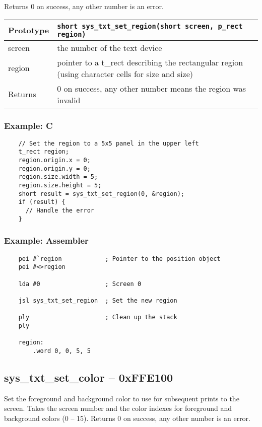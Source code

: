 Returns 0 on success, any other number is an error.

\bigskip

\begin{tabular}{|l||l|} \hline
Prototype & \lstinline!short sys_txt_set_region(short screen, p_rect region)! \\ \hline
screen & the number of the text device \\ \hline
region & pointer to a t\_rect describing the rectangular region (using character cells for size and size) \\ \hline
Returns & 0 on success, any other number means the region was invalid \\ \hline
\end{tabular}

\subsubsection*{Example: C}
\begin{lstlisting}
    // Set the region to a 5x5 panel in the upper left
    t_rect region;
    region.origin.x = 0;
    region.origin.y = 0;
    region.size.width = 5;
    region.size.height = 5;
    short result = sys_txt_set_region(0, &region);
    if (result) {
      // Handle the error
    }
\end{lstlisting}

\subsubsection*{Example: Assembler}
\begin{verbatim}
    pei #`region            ; Pointer to the position object
    pei #<>region

    lda #0                  ; Screen 0

    jsl sys_txt_set_region  ; Set the new region

    ply                     ; Clean up the stack
    ply

    region:
        .word 0, 0, 5, 5
\end{verbatim}

\subsection*{sys\_txt\_set\_color -- 0xFFE100}
Set the foreground and background color to use for subsequent prints to the screen.
Takes the screen number and the color indexes for foreground and background colors (0 -- 15).
Returns 0 on success, any other number is an error.

